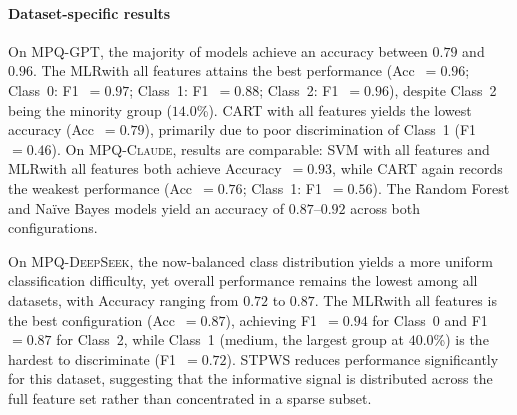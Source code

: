 \documentclass[preprint,12pt,authoryear]{elsarticle}
\newcommand{\dbGPT}{\small\textsc{MPQ-GPT}\xspace}
\newcommand{\dbClaude}{\small\textsc{MPQ-Claude}\xspace}
\newcommand{\dbDeepSeek}{\small\textsc{MPQ-DeepSeek}\xspace}
\newcommand{\dbDoctorAI}{\small\textsc{MPQ-DoctorAI}\xspace}
\begin{document}

\paragraph{Dataset-specific results}
On \dbGPT, the majority of models achieve an accuracy between $0.79$ and $0.96$. The MLRwith all features attains the best performance (Acc~$= 0.96$; Class~0: F1~$= 0.97$; Class~1: F1~$= 0.88$; Class~2: F1~$= 0.96$), despite Class~2 being the minority group ($14.0$\%). CART with all features yields the lowest accuracy (Acc~$= 0.79$), primarily due to poor discrimination of Class~1 (F1~$= 0.46$). On \dbClaude, results are comparable: SVM with all features and MLRwith all features both achieve Accuracy~$= 0.93$, while CART again records the weakest performance (Acc~$= 0.76$; Class~1: F1~$= 0.56$). The Random Forest and Naïve Bayes models yield an accuracy of $0.87$--$0.92$ across both configurations.

On \dbDeepSeek, the now-balanced class distribution yields a more uniform classification difficulty, yet overall performance remains the lowest among all datasets, with Accuracy ranging from $0.72$ to $0.87$. The MLRwith all features is the best configuration (Acc~$= 0.87$), achieving F1~$= 0.94$ for Class~0 and F1~$= 0.87$ for Class~2, while Class~1 (medium, the largest group at $40.0$\%) is the hardest to discriminate (F1~$= 0.72$). STPWS reduces performance significantly for this dataset, suggesting that the informative signal is distributed across the full feature set rather than concentrated in a sparse subset.
\end{document}
